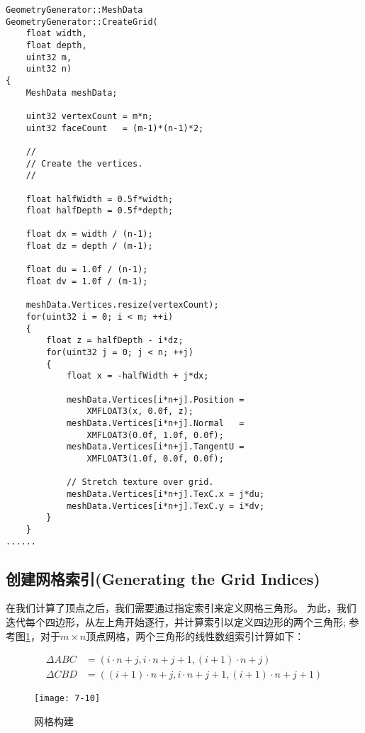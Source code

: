 \begin{lstlisting}
GeometryGenerator::MeshData 
GeometryGenerator::CreateGrid(
    float width, 
    float depth, 
    uint32 m, 
    uint32 n)
{
    MeshData meshData;

    uint32 vertexCount = m*n;
    uint32 faceCount   = (m-1)*(n-1)*2;

    //
    // Create the vertices.
    //

    float halfWidth = 0.5f*width;
    float halfDepth = 0.5f*depth;

    float dx = width / (n-1);
    float dz = depth / (m-1);

    float du = 1.0f / (n-1);
    float dv = 1.0f / (m-1);

    meshData.Vertices.resize(vertexCount);
    for(uint32 i = 0; i < m; ++i)
    {
        float z = halfDepth - i*dz;
        for(uint32 j = 0; j < n; ++j)
        {
            float x = -halfWidth + j*dx;

            meshData.Vertices[i*n+j].Position = 
                XMFLOAT3(x, 0.0f, z);
            meshData.Vertices[i*n+j].Normal   = 
                XMFLOAT3(0.0f, 1.0f, 0.0f);
            meshData.Vertices[i*n+j].TangentU = 
                XMFLOAT3(1.0f, 0.0f, 0.0f);

            // Stretch texture over grid.
            meshData.Vertices[i*n+j].TexC.x = j*du;
            meshData.Vertices[i*n+j].TexC.y = i*dv;
        }
    }
......
\end{lstlisting}

\subsection{创建网格索引(Generating the Grid Indices)}
\begin{flushleft}
在我们计算了顶点之后，我们需要通过指定索引来定义网格三角形。 为此，我们迭代每个四边形，从左上角开始逐行，并计算索引以定义四边形的两个三角形; 参考图\ref{fig:7-10}，对于$m\times n$顶点网格，两个三角形的线性数组索引计算如下：\\
\end{flushleft}

\begin{align*}
\Delta ABC&=(i\cdot n+j,i\cdot n+j+1,(i+1)\cdot n+j)\\
\Delta CBD&=((i+1)\cdot n+j,i\cdot n+j+1,(i+1)\cdot n+j+1)
\end{align*}

\begin{figure}[h]
    \texttt{[image: 7-10]}
    \centering
    \caption{网格构建}
    \label{fig:7-10}
\end{figure}

